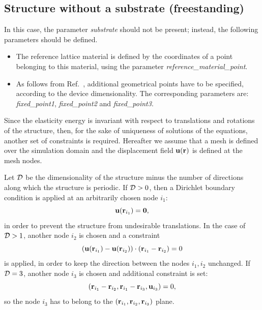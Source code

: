 \subsection{Structure without a substrate (freestanding)}

In this case, the parameter \textit{substrate} should not be present; instead, the following parameters should be defined.
\begin{itemize}
\item The reference lattice material
is defined by the coordinates of a point  belonging to this  material, using the parameter \textit{reference\_material\_point}.
\item As  follows from Ref.~\cite{strain1},  additional geometrical points have to be specified, according  to the device dimensionality. The corresponding parameters are:
\textit{fixed\_point1}, \textit{fixed\_point2} and \textit{fixed\_point3}.
\end{itemize}
Since the elasticity energy is invariant with respect  to  translations and rotations of the structure, then, for the sake of uniqueness of solutions of the equations,  another set of constraints is required.  Hereafter we assume that a mesh is defined over the simulation domain and the displacement field ${\bf u}({\bf r})$ is defined at the mesh nodes. 

 Let $\cal D$ be  the dimensionality of the structure minus the number of directions along which the structure is
 periodic. If ${\cal D} > 0$, then a Dirichlet boundary condition is applied at an arbitrarily chosen  
 node $i_1$: 
\begin{equation} 
{\bf u} ({\bf r}_{i_1}) = {\bf 0},
 \end{equation}
in order to prevent the structure from  undesirable translations.
In the case of ${\cal D} > 1$, another node  $i_2$ is chosen and a constraint
 \begin{equation}
 ({\bf u} ({\bf r}_{i_1}) - {\bf u} ({\bf r}_{i_2}))\cdot({\bf r}_{i_1} - {\bf r}_{i_2}) = 0
 \label{constr2D}
 \end{equation}
is applied, in order to keep the direction between the nodes $i_1, i_2$ unchanged.  If ${\cal D} = 3$, another node $i_3$ is chosen and additional constraint is set:
\begin{equation}
 \left( {\bf r}_{i_1}- {\bf r}_{i_2}, {\bf r}_{i_1} - {\bf r}_{i_3}, {\bf u}_{i_3} \right) =0,
\end{equation}
so the node $i_3$ has to belong to the $({\bf r}_{i_1}, {\bf r}_{i_2}, {\bf r}_{i_3})$ plane. 
 





